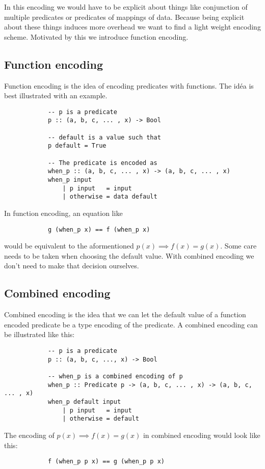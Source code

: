         In this encoding we would have to be explicit about things like conjunction
        of multiple predicates or predicates of mappings of data.
        Because being explicit about these things induces more overhead
        we want to find a light weight encoding scheme. Motivated by this
        we introduce function encoding.

    \subsection{Function encoding}

        Function encoding is the idea of encoding 
        predicates with functions. The idéa is best
        illustrated with an example.
        \begin{verbatim}
            -- p is a predicate
            p :: (a, b, c, ... , x) -> Bool

            -- default is a value such that
            p default = True

            -- The predicate is encoded as
            when_p :: (a, b, c, ... , x) -> (a, b, c, ... , x)
            when_p input
                | p input   = input
                | otherwise = data default
        \end{verbatim}
        In function encoding, an equation like
        \begin{verbatim}
            g (when_p x) == f (when_p x)
        \end{verbatim}
        would be equivalent to the aformentioned $p(x) \implies f(x) = g(x)$.
        Some care needs to be taken when choosing the default value.
        With combined encoding we don't need to make that decision ourselves.

     \subsection{Combined encoding}\label{combined_encoding}
        
        Combined encoding is the idea that we can let the
        default value of a function encoded predicate be a type
        encoding of the predicate. A combined encoding can be illustrated
        like this:
        \begin{verbatim}
            -- p is a predicate
            p :: (a, b, c, ..., x) -> Bool  

            -- when_p is a combined encoding of p
            when_p :: Predicate p -> (a, b, c, ... , x) -> (a, b, c, ... , x)
            when_p default input
                | p input   = input
                | otherwise = default
        \end{verbatim}
        The encoding of $p(x) \implies f(x) = g(x)$ in combined encoding would look like
        this:
        \begin{verbatim}
            f (when_p p x) == g (when_p p x)
        \end{verbatim}
